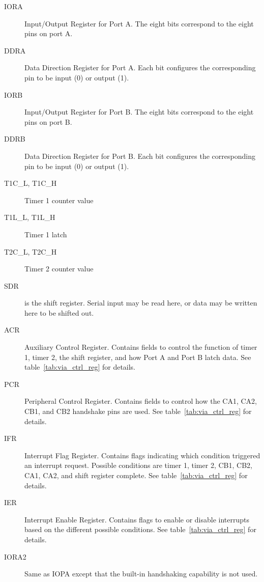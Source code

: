 \begin{description}
    \item[IORA] Input/Output Register for Port A. The eight bits correspond to the eight pins on port A.

    \item[DDRA] Data Direction Register for Port A. Each bit configures the corresponding pin to be input (0) or output (1).

    \item[IORB] Input/Output Register for Port B. The eight bits correspond to the eight pins on port B.

    \item[DDRB] Data Direction Register for Port B. Each bit configures the corresponding pin to be input (0) or output (1).

    \item[T1C\_L, T1C\_H] Timer 1 counter value

    \item[T1L\_L, T1L\_H] Timer 1 latch

    \item[T2C\_L, T2C\_H] Timer 2 counter value

    \item[SDR] is the shift register. Serial input may be read here, or data may be written here to be shifted out.

    \item[ACR] Auxiliary Control Register. Contains fields to control the function of timer 1, timer 2, the shift register, and how Port A and Port B latch data. See table~\ref{tab:via_ctrl_reg} for details.

    \item[PCR] Peripheral Control Register. Contains fields to control how the CA1, CA2, CB1, and CB2 handshake pins are used. See table~\ref{tab:via_ctrl_reg} for details.

    \item[IFR] Interrupt Flag Register. Contains flags indicating which condition triggered an interrupt request. Possible conditions are timer 1, timer 2, CB1, CB2, CA1, CA2, and shift register complete. See table~\ref{tab:via_ctrl_reg} for details.

    \item[IER] Interrupt Enable Register. Contains flags to enable or disable interrupts based on the different possible conditions. See table~\ref{tab:via_ctrl_reg} for details.

    \item[IORA2] Same as IOPA except that the built-in handshaking capability is not used.

\end{description}

